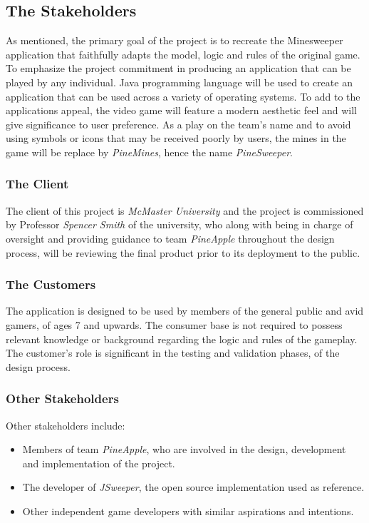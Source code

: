 \documentclass[12pt, titlepage]{article}
\begin{document}
\subsection{The Stakeholders}
As mentioned, the primary goal of the project is to recreate the Minesweeper application that faithfully adapts the model, logic and rules
of the original game. To emphasize the project commitment in producing an application that can be played by any individual. Java
programming language will be used to create an application that can be used across a variety of operating systems. To add to the
applications appeal, the video game will feature a modern aesthetic feel and will give significance to user preference. As a play on the
team's name and to avoid using symbols or icons that may be received poorly by users, the mines in the game will be replace by
\textit{PineMines}, hence the name \textit{PineSweeper}.

\subsubsection{The Client}
The client of this project is \textit{McMaster University} and the project is commissioned by Professor \textit{Spencer Smith} of the university, who along with being in charge of oversight and providing guidance to team \textit{PineApple} throughout the design process, will be reviewing the final product prior to its deployment to the public.

\subsubsection{The Customers}
The application is designed to be used by members of the general public and avid gamers, of ages 7 and upwards. The consumer base
is not required to possess relevant knowledge or background regarding the logic and rules of the gameplay. The customer's role is
significant in the testing and validation phases, of  the design process.

\subsubsection{Other Stakeholders}
Other stakeholders include:
\begin{itemize}
	\item Members of team \textit{PineApple}, who are involved in the design, development and implementation of the project.
	\item The developer of \textit{JSweeper}, the open source implementation used as reference.
	\item Other independent game developers with similar aspirations and intentions.
\end{itemize}
\end{document}

